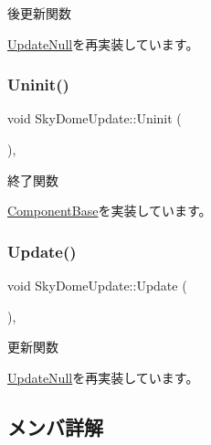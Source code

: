 後更新関数 



\mbox{\hyperlink{class_update_null_ac68da1ba7f3fbcae833442bb1c169200}{Update\+Null}}を再実装しています。

\mbox{\label{class_sky_dome_update_a54da74ef017a22075ce473abe1345489}} 
\subsubsection{\texorpdfstring{Uninit()}{Uninit()}}
{\footnotesize\ttfamily void Sky\+Dome\+Update\+::\+Uninit (\begin{DoxyParamCaption}{ }\end{DoxyParamCaption})\hspace{0.3cm}{\ttfamily [override]}, {\ttfamily [virtual]}}



終了関数 



\mbox{\hyperlink{class_component_base_a9f42beaf0383d6f629819579cab4de57}{Component\+Base}}を実装しています。

\mbox{\label{class_sky_dome_update_ae163cb90e4de561fe1f7b2cb311be331}} 
\subsubsection{\texorpdfstring{Update()}{Update()}}
{\footnotesize\ttfamily void Sky\+Dome\+Update\+::\+Update (\begin{DoxyParamCaption}{ }\end{DoxyParamCaption})\hspace{0.3cm}{\ttfamily [override]}, {\ttfamily [virtual]}}



更新関数 



\mbox{\hyperlink{class_update_null_a692f4f34e4ef35ca286a1d3606fdf473}{Update\+Null}}を再実装しています。



\subsection{メンバ詳解}
\mbox{\label{class_sky_dome_update_a4c6750a54880db753cfe2a4ecfd24130}} 

